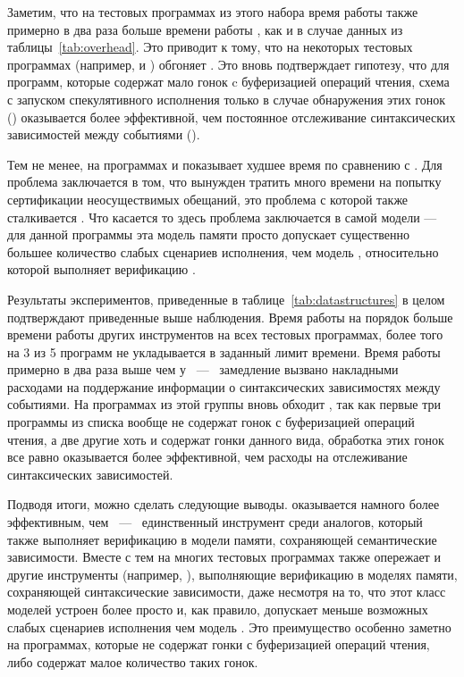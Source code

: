 Заметим, что на тестовых программах из этого набора 
время работы \hmc также примерно в два раза больше времени работы \genmc, 
как и в случае данных из таблицы~\ref{tab:overhead}.
Это приводит к тому, что на некоторых тестовых программах 
(например,  и ) \wmc обгоняет \hmc.
Это вновь подтверждает гипотезу, что для программ, 
которые содержат мало гонок c буферизацией операций чтения, 
схема с запуском спекулятивного исполнения только в случае 
обнаружения этих гонок (\wmc) оказывается более эффективной, 
чем постоянное отслеживание синтаксических зависимостей между событиями (\hmc). 

Тем не менее, на программах  и 
\wmc показывает худшее время по сравнению с \hmc.
Для  проблема заключается в том, 
что \wmc вынужден тратить много времени 
на попытку сертификации неосуществимых обещаний, 
это проблема с которой также сталкивается \CDSChecker.
Что касается  то здесь проблема 
заключается в самой модели \WkmS --- для 
данной программы эта модель памяти просто допускает 
существенно большее количество слабых сценариев исполнения, 
чем модель \IMM, относительно которой выполняет верификацию \hmc. 



Результаты экспериментов, приведенные в таблице~\ref{tab:datastructures}
в целом подтверждают приведенные выше наблюдения. 
Время работы \CDSChecker на порядок больше времени 
работы других инструментов на всех тестовых программах, 
более того на 3 из 5 программ \CDSChecker не укладывается 
в заданный лимит времени. Время работы \hmc примерно в
два раза выше чем у \genmc~---~ замедление вызвано накладными расходами
на поддержание информации о синтаксических зависимостях между событиями.
На программах из этой группы \wmc вновь обходит \hmc, 
так как первые три программы из списка вообще не содержат 
гонок с буферизацией операций чтения, 
а две другие хоть и содержат гонки данного вида, 
обработка этих гонок все равно оказывается 
более эффективной, чем расходы на отслеживание синтаксических зависимостей.

Подводя итоги, можно сделать следующие выводы. 
\wmc оказывается намного более эффективным, чем \CDSChecker~---~ 
единственный инструмент среди аналогов, который 
также выполняет верификацию в модели памяти, сохраняющей семантические зависимости.    
Вместе с тем на многих тестовых программах \wmc также опережает 
и другие инструменты (например, \hmc),
выполняющие верификацию в моделях памяти, 
сохраняющей синтаксические зависимости, даже 
несмотря на то, что этот класс моделей устроен более просто
и, как правило, допускает меньше возможных 
слабых сценариев исполнения чем модель \WkmS.
Это преимущество особенно заметно на программах, 
которые не содержат гонки с буферизацией операций чтения, 
либо содержат малое количество таких гонок. 

